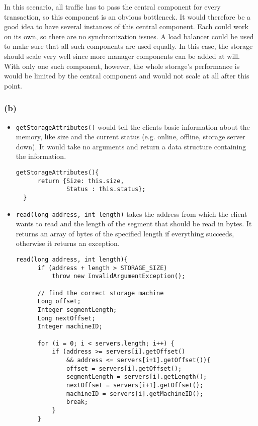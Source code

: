 \documentclass[12pt,a4paper]{article}
\begin{document}
In this scenario, all traffic has to pass the central component for every transaction, so this component is an obvious bottleneck. It would therefore be a good idea to have several instances of this central component. Each could work on its own, so there are no synchronization issues. A load balancer could be used to make sure that all such components are used equally. In this case, the storage should scale very well since more manager components can be added at will. With only one such component, however, the whole storage's performance is would be limited by the central component and would not scale at all after this point.
\subsubsection*{(b)}
\begin{itemize}
  \item \texttt{getStorageAttributes()} would tell the clients basic information about the memory, like size and the current status (e.g. online, offline, storage server down). It would take no arguments and return a data structure containing the information.
  
  \begin{lstlisting}[basicstyle=\footnotesize]
  getStorageAttributes(){
      return {Size: this.size,
              Status : this.status};
  }
  \end{lstlisting}
  \item \texttt{read(long address, int length)} takes the address from which the client wants to read and the length of the segment that should be read in bytes. It returns an array of bytes of the specified length if everything succeeds, otherwise it returns an exception.
  \begin{lstlisting}[basicstyle=\footnotesize]
  read(long address, int length){
      if (address + length > STORAGE_SIZE)
          throw new InvalidArgumentException();
  
      // find the correct storage machine
      Long offset;
      Integer segmentLength;
      Long nextOffset;
      Integer machineID;
      
      for (i = 0; i < servers.length; i++) {
          if (address >= servers[i].getOffset()
              && address <= servers[i+1].getOffset()){
              offset = servers[i].getOffset();
              segmentLength = servers[i].getLength();
              nextOffset = servers[i+1].getOffset();
              machineID = servers[i].getMachineID();
              break;
          }
      }
      

\end{lstlisting}
\end{itemize}
\end{document}
